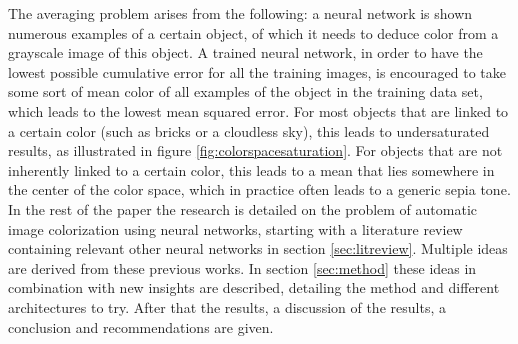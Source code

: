 The averaging problem arises from the following: a neural network is shown numerous examples of a certain object, of which it needs to deduce color from a grayscale image of this object. 
A trained neural network, in order to have the lowest possible cumulative error for all the training images, is encouraged to take some sort of mean color of all examples of the object in the training data set, which leads to the lowest mean squared error. For most objects that are linked to a certain color (such as bricks or a cloudless sky), this leads to undersaturated results, as illustrated in figure \ref{fig:colorspacesaturation}. 
For objects that are not inherently linked to a certain color, this leads to a mean that lies somewhere in the center of the color space, which in practice often leads to a generic sepia tone\cite{Dahl}.\\
	
In the rest of the paper the research is detailed on the problem of automatic image colorization using neural networks, starting with a literature review containing relevant other neural networks in section \ref{sec:litreview}. Multiple ideas are derived from these previous works. In section \ref{sec:method} these ideas in combination with new insights are described, detailing the method and different architectures to try. After that the results, a discussion of the results, a conclusion and recommendations are given.
	
	




